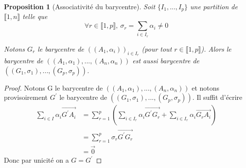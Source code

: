 \documentclass[french]{book}
\theoremstyle{plain}
\newtheorem{prop}{Proposition}[chapter]
\theoremstyle{definition}
\theoremstyle{remark}
\begin{document}
\begin{prop}[Associativité du barycentre]
	Soit $\{I_{1},...,I_{p}\}$ une partition de $\llbracket1,n\rrbracket$ telle que $$\forall r\in \llbracket1,p\rrbracket,\ \sigma_{r}=\sum_{i\in I_{r}}\alpha_{i}\ne0$$

Notons $G_{r}$ le barycentre de $((A_{1},\alpha_{i}))_{i\in I_{r}}$ (pour tout $r\in\llbracket1,p\rrbracket$). Alors le barycentre de $((A_{1},\alpha_{1}),...,(A_{n},\alpha_{n}))$ est aussi barycentre de $((G_{1},\sigma_{1}),...,(G_{p},\sigma_{p}))$.
\end{prop}

\begin{proof}
	Notons G le barycentre de $((A_{1},\alpha_{1}),...,(A_{n},\alpha_{n}))$ et notons provisoirement $G^{\prime}$ le barycentre de $((G_{1},\sigma_{1}),...,(G_{p},\sigma_{p})).$ Il suffit d'écrire 
	\begin{align*}
		\sum_{i\in I}\alpha_{i}\overrightarrow{G^{\prime}A_{i}}&=\sum_{r=1}^{p}\left(\sum_{i\in I_{r}}\alpha_{i}\overrightarrow{G^{\prime}G_{r}}+\sum_{i\in I_{r}}\alpha_{i}\overrightarrow{G_{r}A_{i}}\right)\\
		&=\sum_{r=1}^{p}\sigma_{r}\overrightarrow{G^{\prime}G_{r}}\\
		&=\overrightarrow{0}
	\end{align*} Donc par unicité on a $G=G^{\prime}$
\end{proof}
\end{document}
